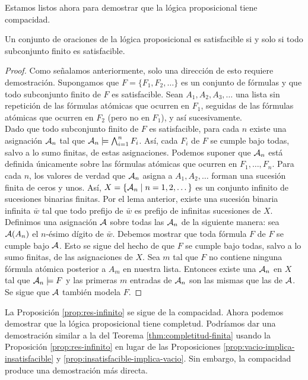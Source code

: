 \documentclass[12pt,a4paper]{book}
\begin{document}
    Estamos listos ahora para demostrar que la lógica proposicional tiene compacidad.

    \begin{teorema}\label{thm:compacidad}
        Un conjunto de oraciones de la lógica proposicional es satisfacible si y solo si todo subconjunto finito es
        satisfacible.
    \end{teorema}
    \begin{proof}
        Como señalamos anteriormente, solo una dirección de esto requiere demostración. Supongamos que
        $F=\{F_{1},F_{2},\dots\}$ es un conjunto de fórmulas y que todo subconjunto finito de $F$ es satisfacible. Sean
        $A_{1},A_{2},A_{3},\dots$ una lista sin repetición de las fórmulas atómicas que ocurren en $F_{1}$, seguidas de las
        fórmulas atómicas que ocurren en $F_{2}$ (pero no en $F_{1}$), y así sucesivamente.\\
        Dado que todo subconjunto finito de $F$ es satisfacible, para cada $n$ existe una asignación $\AA_{n}$ tal que
        $\AA_{n}\models\bigwedge_{i=1}^{n}F_{i}$. Así, cada $F_{i}$ de $F$ se cumple bajo todas, salvo a lo sumo finitas, de
        estas asignaciones. Podemos suponer que $\AA_{n}$ está definida únicamente sobre las fórmulas atómicas que ocurren
        en $F_{1},\dots,F_{n}$. Para cada $n$, los valores de verdad que $\AA_{n}$ asigna a $A_{1},A_{2},\dots$ forman una
        sucesión finita de ceros y unos. Así, $X=\{\AA_{n}\mid n=1,2,\dots\}$ es un conjunto infinito de sucesiones binarias
        finitas. Por el lema anterior, existe una sucesión binaria infinita $\bar{w}$ tal que todo prefijo de $\bar{w}$ es
        prefijo de infinitas sucesiones de $X$.\\
        Definimos una asignación $\AA$ sobre todas las $\AA_{n}$ de la siguiente manera: sea $\AA(A_{n})$ el $n$-ésimo
        dígito de $\bar{w}$. Debemos mostrar que toda fórmula $F$ de $F$ se cumple bajo $\AA$. Esto se sigue del hecho de
        que $F$ se cumple bajo todas, salvo a lo sumo finitas, de las asignaciones de $X$. Sea $m$ tal que $F$ no contiene
        ninguna fórmula atómica posterior a $A_{m}$ en nuestra lista. Entonces existe una $\AA_{n}$ en $X$ tal que
        $\AA_{n}\models F$ y las primeras $m$ entradas de $\AA_{n}$ son las mismas que las de $\AA$. Se sigue que $\AA$
        también modela $F$.
    \end{proof}

    La Proposición \ref{prop:res-infinito} se sigue de la compacidad. Ahora podemos demostrar que la lógica proposicional
    tiene completud. Podríamos dar una demostración similar a la del Teorema \ref{thm:completitud-finita} usando la
    Proposición \ref{prop:res-infinito} en lugar de las Proposiciones \ref{prop:vacio-implica-insatisfacible} y
    \ref{prop:insatisfacible-implica-vacio}. Sin embargo, la compacidad produce una demostración más directa.
\end{document}
